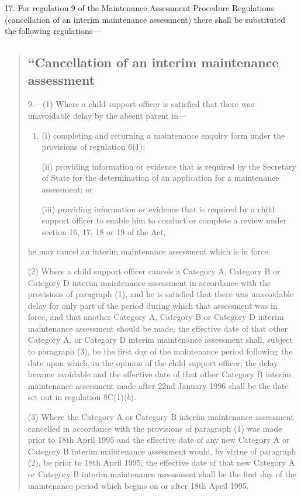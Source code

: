 \documentclass[12pt,a4paper]{article}
\begin{document}
17.  For regulation 9 of the Maintenance Assessment Procedure Regulations (cancellation of an interim maintenance assessment) there shall be substituted the following regulations—
\begin{quotation}
\subsection*{“Cancellation of an interim maintenance assessment}

9.—(1) Where a child support officer is satisfied that there was unavoidable delay by the absent parent in—
\begin{enumerate}\item[]
(i) completing and returning a maintenance enquiry form under the provisions of regulation 6(1);

(ii) providing information or evidence that is required by the Secretary of State for the determination of an application for a maintenance assessment; or

(iii) providing information or evidence that is required by a child support officer to enable him to conduct or complete a review under section 16, 17, 18 or 19 of the Act,
\end{enumerate}
he may cancel an interim maintenance assessment which is in force.

(2) Where a child support officer cancels a Category A, Category B or Category D interim maintenance assessment in accordance with the provisions of paragraph (1), and he is satisfied that there was unavoidable delay for only part of the period during which that assessment was in force, and that another Category A, Category B or Category D interim maintenance assessment should be made, the effective date of that other Category A, or Category D interim maintenance assessment shall, subject to paragraph (3), be the first day of the maintenance period following the date upon which, in the opinion of the child support officer, the delay became avoidable and the effective date of that other Category B interim maintenance assessment made after 22nd January 1996 shall be the date set out in regulation 8C(1)($b$).

(3) Where the Category A or Category B interim maintenance assessment cancelled in accordance with the provisions of paragraph (1) was made prior to 18th April 1995 and the effective date of any new Category A or Category B interim maintenance assessment would, by virtue of paragraph (2), be prior to 18th April 1995, the effective date of that new Category A or Category B interim maintenance assessment shall be the first day of the maintenance period which begins on or after 18th April 1995.


\end{quotation}
\end{document}
